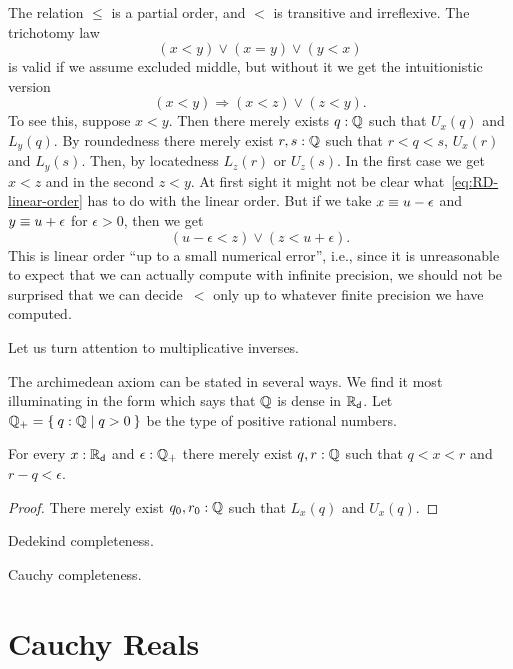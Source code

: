 The relation $\leq$ is a partial order, and $<$ is transitive and irreflexive. The
trichotomy law
%
\begin{equation*}
  (x < y) \lor (x = y) \lor (y < x)
\end{equation*}
%
is valid if we assume excluded middle, but without it we get the intuitionistic version
%
\begin{equation} \label{eq:RD-linear-order}
  (x < y) \Rightarrow (x < z) \lor (z < y).
\end{equation}
%
To see this, suppose $x < y$. Then there merely exists $q : \mathbb{Q}$ such that $U_x(q)$ and
$L_y(q)$. By roundedness there merely exist $r, s : \mathbb{Q}$ such that $r < q < s$, $U_x(r)$
and $L_y(s)$. Then, by locatedness $L_z(r)$ or $U_z(s)$. In the first case we get $x < z$
and in the second $z < y$. At first sight it might not be clear
what~\eqref{eq:RD-linear-order} has to do with the linear order. But if we take $x \equiv
u - \epsilon$ and $y \equiv u + \epsilon$ for $\epsilon > 0$, then we get
%
\begin{equation*}
  (u - \epsilon < z) \lor (z < u + \epsilon).
\end{equation*}
%
This is linear order ``up to a small numerical error'', i.e., since it is unreasonable to
expect that we can actually compute with infinite precision, we should not be surprised
that we can decide~$<$ only up to whatever finite precision we have computed.

Let us turn attention to multiplicative inverses.


The archimedean axiom can be stated in several ways. We find it most illuminating in the
form which says that $\mathbb{Q}$ is dense in $\mathbb{R}_\mathsf{d}$. Let $\Qp = \setof{ q : \Q | q > 0 }$ be the
type of positive rational numbers.

\begin{thm} \label{dedekind-archimedean}
  For every $x : \mathbb{R}_\mathsf{d}$ and $\epsilon : \mathbb{Q}_{+}$ there merely exist $q, r : \mathbb{Q}$ such that $q < x
  < r$ and $r - q < \epsilon$.
\end{thm}

\begin{proof}
  There merely exist $q_0, r_0 : \mathbb{Q}$ such that $L_x(q)$ and $U_x(q)$.
\end{proof}


Dedekind completeness.

Cauchy completeness.



\section{Cauchy Reals}
\label{sec:cauchy-reals}

